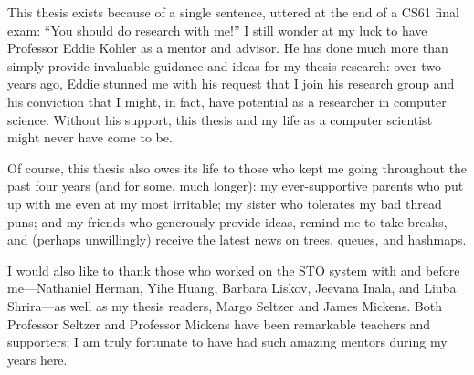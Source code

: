 This thesis exists because of a single sentence, uttered at the end of a CS61 final exam: ``You should do research with me!'' I still wonder at my luck to have Professor Eddie Kohler as a mentor and advisor. He has done much more than simply provide invaluable guidance and ideas for my thesis research: over two years ago, Eddie stunned me with his request that I join his research group and his conviction that I might, in fact, have potential as a researcher in computer science. Without his support, this thesis and my life as a computer scientist might never have come to be.

    Of course, this thesis also owes its life to those who kept me going throughout the past four years (and for some, much longer): my ever-supportive parents who put up with me even at my most irritable; my sister who tolerates my bad thread puns; and my friends who generously provide ideas, remind me to take breaks, and (perhaps unwillingly) receive the latest news on trees, queues, and hashmaps.

        I would also like to thank those who worked on the STO system with and before me---Nathaniel Herman, Yihe Huang, Barbara Liskov, Jeevana Inala, and Liuba Shrira---as well as my thesis readers, Margo Seltzer and James Mickens. Both Professor Seltzer and Professor Mickens have been remarkable teachers and supporters; I am truly fortunate to have had such amazing mentors during my years here.
